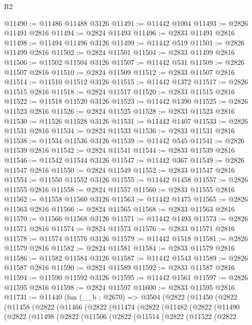\begin{lexlean}{R2}
\begin{coremodule}
@11490 := @11486 @11488 @3126
@11491 := @11442 @1004
@11493 := @2826 @11491 @2816
@11494 := @2824 @11493
@11496 := @2833 @11491 @2816
@11498 := @11494 @11496 @3126
@11499 := @11442 @519
@11501 := @2826 @11499 @2816
@11502 := @2824 @11501
@11504 := @2833 @11499 @2816
@11506 := @11502 @11504 @3126
@11507 := @11442 @531
@11509 := @2826 @11507 @2816
@11510 := @2824 @11509
@11512 := @2833 @11507 @2816
@11514 := @11510 @11512 @3126
@11515 := @11442 @1372
@11517 := @2826 @11515 @2816
@11518 := @2824 @11517
@11520 := @2833 @11515 @2816
@11522 := @11518 @11520 @3126
@11523 := @11442 @1390
@11525 := @2826 @11523 @2816
@11526 := @2824 @11525
@11528 := @2833 @11523 @2816
@11530 := @11526 @11528 @3126
@11531 := @11442 @1407
@11533 := @2826 @11531 @2816
@11534 := @2824 @11533
@11536 := @2833 @11531 @2816
@11538 := @11534 @11536 @3126
@11539 := @11442 @545
@11541 := @2826 @11539 @2816
@11542 := @2824 @11541
@11544 := @2833 @11539 @2816
@11546 := @11542 @11544 @3126
@11547 := @11442 @367
@11549 := @2826 @11547 @2816
@11550 := @2824 @11549
@11552 := @2833 @11547 @2816
@11554 := @11550 @11552 @3126
@11555 := @11442 @1458
@11557 := @2826 @11555 @2816
@11558 := @2824 @11557
@11560 := @2833 @11555 @2816
@11562 := @11558 @11560 @3126
@11563 := @11442 @1475
@11565 := @2826 @11563 @2816
@11566 := @2824 @11565
@11568 := @2833 @11563 @2816
@11570 := @11566 @11568 @3126
@11571 := @11442 @1493
@11573 := @2826 @11571 @2816
@11574 := @2824 @11573
@11576 := @2833 @11571 @2816
@11578 := @11574 @11576 @3126
@11579 := @11442 @1518
@11581 := @2826 @11579 @2816
@11582 := @2824 @11581
@11584 := @2833 @11579 @2816
@11586 := @11582 @11584 @3126
@11587 := @11442 @1543
@11589 := @2826 @11587 @2816
@11590 := @2824 @11589
@11592 := @2833 @11587 @2816
@11594 := @11590 @11592 @3126
@11595 := @11442 @1561
@11597 := @2826 @11595 @2816
@11598 := @2824 @11597
@11600 := @2833 @11595 @2816
@11731 := @11440
    (fun (__b : @2670) =>
    @3504
      (@2822
        (@11450
          (@2822
            (@11458
              (@2822
                (@11466
                  (@2822
                    (@11474
                      (@2822
                        (@11482
                          (@2822
                            (@11490
                              (@2822
                                (@11498
                                  (@2822
                                    (@11506
                                      (@2822
                                        (@11514
                                          (@2822
                                            (@11522
                                              (@2822

\end{coremodule}
\end{lexlean}
